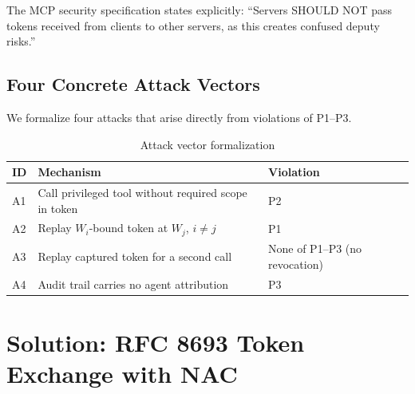 \documentclass[journal]{IEEEtran}
\begin{document}
The MCP security specification \cite{mcp_security} states explicitly: ``Servers SHOULD NOT pass tokens received from clients to other servers, as this creates confused deputy risks.''

\subsection{Four Concrete Attack Vectors}

We formalize four attacks that arise directly from violations of P1--P3.

\begin{table}[h]
\caption{Attack vector formalization}
\label{tab:attack_formal}
\centering
\footnotesize
\begin{tabularx}{\columnwidth}{l X l}
\toprule
\textbf{ID} & \textbf{Mechanism} & \textbf{Violation} \\
\midrule
A1 & Call privileged tool without required scope in token & P2 \\
A2 & Replay $W_i$-bound token at $W_j$, $i \neq j$ & P1 \\
A3 & Replay captured token for a second call & None of P1--P3 (no revocation) \\
A4 & Audit trail carries no agent attribution & P3 \\
\bottomrule
\end{tabularx}
\end{table}



\section{Solution: RFC 8693 Token Exchange with NAC}
\label{sec:solution}
\end{document}
